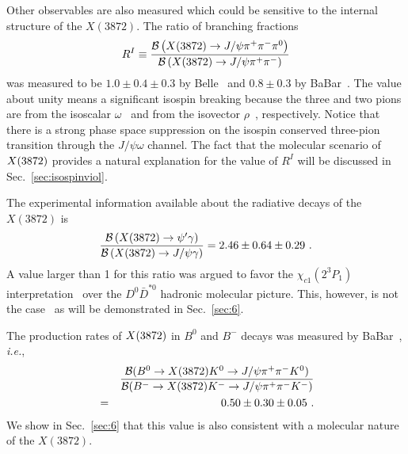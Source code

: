 Other  observables are also measured which could be sensitive to the internal
structure of the $X(3872)$. The ratio of branching fractions 
\[ R^I\equiv
\frac{\mathcal{B}\left(X(3872)\to J/\psi \pi^+\pi^-\pi^0\right)}{\mathcal{B}\left(X(3872) \to J/\psi\pi^+\pi^-\right)}
\] 
was
measured to be $1.0\pm 0.4\pm 0.3$ by Belle~\cite{Abe:2005ix} and $0.8\pm 0.3$ by
BaBar~\cite{delAmoSanchez:2010jr}. The value about unity means a significant
isospin breaking because the three and two pions are  from the isoscalar
$\omega$~\cite{Abe:2005ix,delAmoSanchez:2010jr} and from the isovector
$\rho$~\cite{Abulencia:2005zc}, respectively.
Notice that there is a strong  phase space suppression on the isospin conserved
three-pion transition through the $J/\psi\omega$ channel. The fact that the
molecular scenario of $X(3872)$ provides a natural explanation for the value of $R^I$
will be discussed in Sec.~\ref{sec:isospinviol}.


The experimental information available about the radiative decays of the 
$X(3872)$ is~\cite{Aaij:2014ala} 
\begin{equation}
\frac{\mathcal{B}\left(X(3872)\to \psi^\prime\gamma\right)}{\mathcal{B}\left(X(3872) \to J/\psi\gamma\right)} = 2.46\pm 
0.64\pm 0.29 \ . 
\label{eq:sec2X3872R}
\end{equation}
A value larger than 1 for this ratio was argued to favor the 
$\chi_{c1}(2^3P_1)$ 
interpretation~\cite{Swanson:2004pp} 
over the $D^0\bar{D}^{*0}$ hadronic molecular picture. This, however, is not 
the case~\cite{Mehen:2011ds,Guo:2014taa} as will be demonstrated in 
Sec.~\ref{sec:6}. 


The production  rates of $X(3872)$ in $B^0$ and $B^-$ decays was measured by 
BaBar~\cite{Aubert:2005zh}, {\sl i.e.}, 
\begin{eqnarray}
&& \frac{\mathcal{B}(B^0\to X(3872) K^0\to J/\psi \pi^+\pi^-
K^0)}{\mathcal{B} (B^-\to X(3872) K^-\to J/\psi \pi^+\pi^- K^-)}  \nonumber\\
&=& 0.50\pm 0.30\pm
0.05 \ .
\label{eq:sec2X3872RB}
\end{eqnarray}
We show in Sec.~\ref{sec:6} that this value is also consistent with a   
molecular nature of the $X(3872)$.

